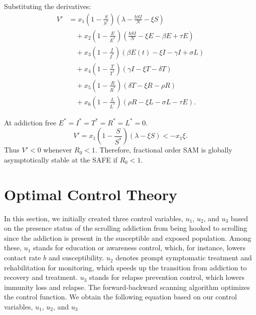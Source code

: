\documentclass[10pt]{article}
\begin{document}
	Substituting the derivatives:
	\begin{align}
		V' &= x_{1}\left( 1 - \frac{S}{S^{\ast}} \right)\left( \lambda - \frac{b SI}{N} - \xi S \right) \nonumber \\
		&\quad + x_{2}\left( 1 - \frac{E}{E^{\ast}} \right)\left( \frac{b SI}{N} - \xi E - \beta E + \tau E \right) \nonumber \\
		&\quad + x_{3}\left( 1 - \frac{I}{I^{\ast}} \right)\left( \beta E(t) - \xi I - \gamma I + \sigma L \right) \nonumber \\
		&\quad + x_{4}\left( 1 - \frac{T}{T^{\ast}} \right)(\gamma I - \xi T - \delta T) \nonumber \\
		&\quad + x_{5}\left( 1 - \frac{R}{R^{\ast}} \right)(\delta T - \xi R - \rho R) \nonumber \\
		&\quad + x_{6}\left( 1 - \frac{L}{L^{\ast}} \right)(\rho R - \xi L - \sigma L - \tau E).
		\label{eq:Vprime_full}
	\end{align}
	
	At addiction free $E^{\ast} = I^{\ast} = T^{\ast} = R^{\ast} = L^{\ast} = 0$.
	\begin{equation}
		V' = x_{1}\left( 1 - \frac{S}{S^{\ast}} \right)(\lambda - \xi S) < - x_{1}\xi.
		\label{eq:Vprime_neg}
	\end{equation}
	Thus $V' < 0$ whenever $R_{0} < 1$. Therefore, fractional order SAM is globally asymptotically stable at the SAFE if $R_{0} < 1.$
	
	\section{Optimal Control Theory}
	
	In this section, we initially created three control variables, $u_{1}$, $u_{2}$, and $u_{3}$ based on the presence status of the scrolling addiction from being hooked to scrolling since the addiction is present in the susceptible and exposed population. Among these, $u_{1}$ stands for education or awareness control, which, for instance, lowers contact rate $b$ and susceptibility. $u_{2}$ denotes prompt symptomatic treatment and rehabilitation for monitoring, which speeds up the transition from addiction to recovery and treatment. $u_{3}$ stands for relapse prevention control, which lowers immunity loss and relapse. The forward-backward scanning algorithm optimizes the control function. We obtain the following equation based on our control variables, $u_{1}$, $u_{2}$, and $u_{3}$
	
\end{document}
